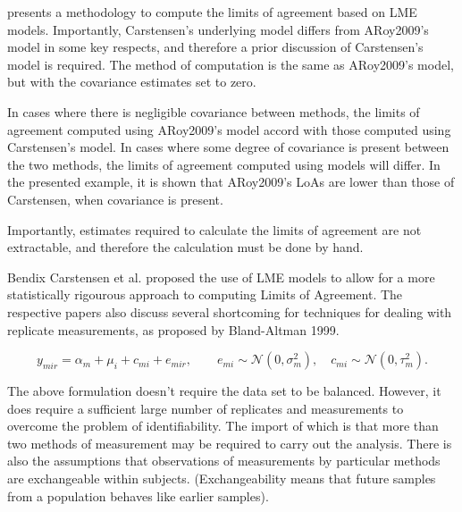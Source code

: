 \documentclass[12pt, a4paper]{report}
\theoremstyle{plain}
\theoremstyle{definition}
\theoremstyle{remark}
\begin{document}
	
	\citet{BXC2008} presents a methodology to compute the limits of
	agreement based on LME models. Importantly, Carstensen's underlying model differs from ARoy2009's model in some key respects, and therefore a prior discussion of Carstensen's model is required. The method of computation is the
	same as ARoy2009's model, but with the covariance estimates set to zero.
	
	In cases where there is negligible covariance between methods, the limits of agreement computed using ARoy2009's model accord with those computed using Carstensen's model. In cases where some degree of
	covariance is present between the two methods, the limits of agreement computed using models will differ. In the presented
	example, it is shown that ARoy2009's LoAs are lower than those of Carstensen, when covariance is present.
	
	Importantly, estimates required to calculate the limits of agreement are not extractable, and therefore the calculation must
	be done by hand.
	
	
	Bendix Carstensen et al. proposed the use of LME models to allow for a more statistically rigourous approach to computing Limits of Agreement.  The respective papers also discuss several shortcoming for techniques for dealing with replicate measurements, as proposed by Bland-Altman 1999.
	
	
	
	\begin{equation}
	y_{mir}  = \alpha_{m} + \mu_{i} + c_{mi} + e_{mir}, \qquad  e_{mi}
	\sim \mathcal{N}(0,\sigma^{2}_{m}), \quad c_{mi} \sim \mathcal{N}(0,\tau^{2}_{m}).
	\end{equation}
	
	
	The above formulation doesn't require the data set to be balanced.
	However, it does require a sufficient large number of replicates
	and measurements to overcome the problem of identifiability. The
	import of which is that more than two methods of measurement may
	be required to carry out the analysis. There is also the
	assumptions that observations of measurements by particular
	methods are exchangeable within subjects. (Exchangeability means
	that future samples from a population behaves like earlier
	samples).
	
	
\end{document}
